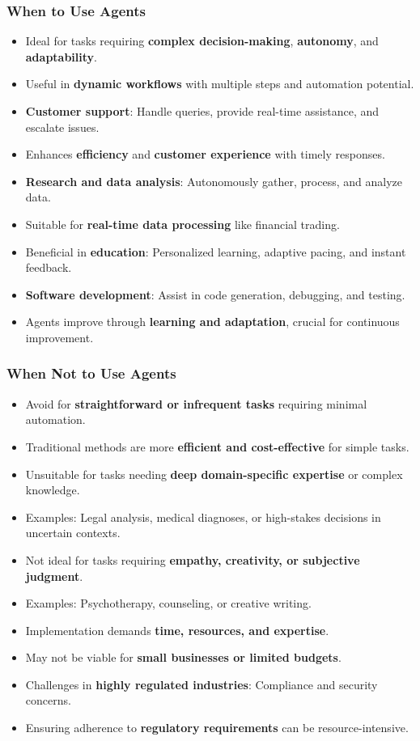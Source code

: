 \begin{frame}[fragile]\frametitle{When to Use Agents}
\begin{itemize}
    \item Ideal for tasks requiring \textbf{complex decision-making}, \textbf{autonomy}, and \textbf{adaptability}.
    \item Useful in \textbf{dynamic workflows} with multiple steps and automation potential.
    \item \textbf{Customer support}: Handle queries, provide real-time assistance, and escalate issues.
    \item Enhances \textbf{efficiency} and \textbf{customer experience} with timely responses.
    \item \textbf{Research and data analysis}: Autonomously gather, process, and analyze data.
    \item Suitable for \textbf{real-time data processing} like financial trading.
    \item Beneficial in \textbf{education}: Personalized learning, adaptive pacing, and instant feedback.
    \item \textbf{Software development}: Assist in code generation, debugging, and testing.
    \item Agents improve through \textbf{learning and adaptation}, crucial for continuous improvement.
\end{itemize}
\end{frame}

\begin{frame}[fragile]\frametitle{When Not to Use Agents}
\begin{itemize}
    \item Avoid for \textbf{straightforward or infrequent tasks} requiring minimal automation.
    \item Traditional methods are more \textbf{efficient and cost-effective} for simple tasks.
    \item Unsuitable for tasks needing \textbf{deep domain-specific expertise} or complex knowledge.
    \item Examples: Legal analysis, medical diagnoses, or high-stakes decisions in uncertain contexts.
    \item Not ideal for tasks requiring \textbf{empathy, creativity, or subjective judgment}.
    \item Examples: Psychotherapy, counseling, or creative writing.
    \item Implementation demands \textbf{time, resources, and expertise}.
    \item May not be viable for \textbf{small businesses or limited budgets}.
    \item Challenges in \textbf{highly regulated industries}: Compliance and security concerns.
    \item Ensuring adherence to \textbf{regulatory requirements} can be resource-intensive.
\end{itemize}
\end{frame}


